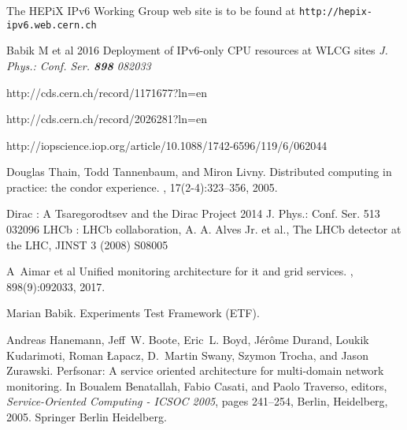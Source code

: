 \begin{thebibliography}{1}
%
%


 The HEPiX IPv6 Working Group web site is to be found at {\tt http://hepix-ipv6.web.cern.ch}

Babik M et al 2016 Deployment of IPv6-only CPU resources at WLCG sites {\it J. Phys.: Conf. Ser. {\bf898} 082033}



  http://cds.cern.ch/record/1171677?ln=en

 http://cds.cern.ch/record/2026281?ln=en

http://iopscience.iop.org/article/10.1088/1742-6596/119/6/062044

Douglas Thain, Todd Tannenbaum, and Miron Livny.
\newblock Distributed computing in practice: the condor experience.
, 17(2-4):323--356, 2005.

 Dirac :  A Tsaregorodtsev and the Dirac Project 2014 J. Phys.: Conf.
Ser. 513 032096
LHCb : LHCb collaboration, A. A. Alves Jr. et al., The LHCb detector at
the LHC, JINST 3 (2008) S08005

A~Aimar et al 
\newblock Unified monitoring architecture for it and grid services.
, 898(9):092033, 2017.

Marian Babik.
\newblock Experiments {Test} {Framework} ({ETF}).

Andreas Hanemann, Jeff~W. Boote, Eric~L. Boyd, J{\'e}r{\^o}me Durand, Loukik
  Kudarimoti, Roman {\L}apacz, D.~Martin Swany, Szymon Trocha, and Jason
  Zurawski.
\newblock Perfsonar: A service oriented architecture for multi-domain network
  monitoring.
\newblock In Boualem Benatallah, Fabio Casati, and Paolo Traverso, editors,
  {\em Service-Oriented Computing - ICSOC 2005}, pages 241--254, Berlin,
  Heidelberg, 2005. Springer Berlin Heidelberg.


\end{thebibliography}
